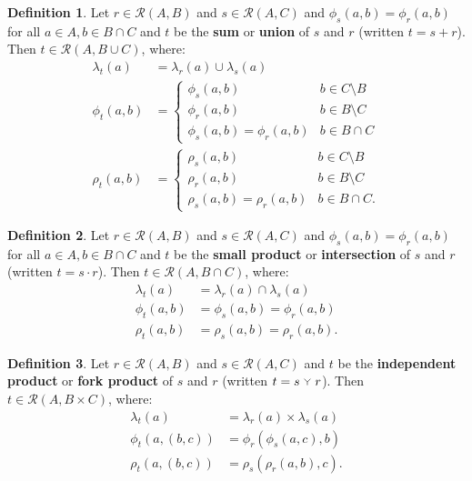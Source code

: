 \documentclass{article}
\theoremstyle{definition}
\newtheorem{definition}{Definition}[subsection]
\theoremstyle{plain}
\def\rule{\mathcal{R}}
\newcommand{\indp}{\mathbin{\: \,\mathclap{\tikz{
  \draw (0, 0) -- (0, -.25em);
  \draw (0, 0) -- (-.25em, .25em);
  \draw (0, 0) -- (.25em, .25em);
}}\: \,}}
\begin{document}
\begin{definition}
  Let $ r \in \rule (A, B) $
  and $ s \in \rule (A, C) $
  and $ \phi_s (a, b) = \phi_r (a, b) $
  for all $ a \in A, b \in B \cap C $
  and $ t $ be the \textbf{sum} or \textbf{union} of $ s $ and $ r $
  (written $ t = s + r $).
  Then $ t \in \rule (A, B \cup C) $, where:
  \begin{align}
    \lambda_t (a)    & = \lambda_r (a) \cup \lambda_s (a) \\
       \phi_t (a, b) & = \begin {cases}
                           \phi_s (a, b)                 & b \in C \setminus B \\
                           \phi_r (a, b)                 & b \in B \setminus C \\
                           \phi_s (a, b) = \phi_r (a, b) & b \in B \cap C
                         \end{cases} \\
        \rho_t (a, b) & = \begin {cases}
                           \rho_s (a, b)                 & b \in C \setminus B \\
                           \rho_r (a, b)                 & b \in B \setminus C \\
                           \rho_s (a, b) = \rho_r (a, b) & b \in B \cap C.
                         \end{cases} 
  \end{align}
\end{definition}

\begin{definition}
  Let $ r \in \rule (A, B) $
  and $ s \in \rule (A, C) $
  and $ \phi_s (a, b) = \phi_r (a, b) $
  for all $ a \in A, b \in B \cap C $
  and $ t $ be the \textbf{small product} or \textbf{intersection} of $ s $ and $ r $
  (written $ t = s \cdot r $).
  Then $ t \in \rule (A, B \cap C) $, where:
  \begin{align}
    \lambda_t (a)    & = \lambda_r (a) \cap \lambda_s (a) \\
       \phi_t (a, b) & = \phi_s (a, b) = \phi_r (a, b) \\
       \rho_t (a, b) & = \rho_s (a, b) = \rho_r (a, b).
  \end{align}
\end{definition}

\begin{definition}
  Let $ r \in \rule (A, B) $
  and $ s \in \rule (A, C) $
  and $ t $ be the \textbf{independent product} or \textbf{fork product} of $ s $ and $ r $
  (written $ t = s \indp r $).
  Then $ t \in \rule (A, B \times C) $, where:
  \begin{align}
    \lambda_t (a)         & = \lambda_r (a) \times \lambda_s (a) \\
       \phi_t (a, (b, c)) & =    \phi_r (\phi_s (a, c), b) \\
       \rho_t (a, (b, c)) & =    \rho_s (\rho_r (a, b), c).
  \end{align}
\end{definition}
\end{document}
